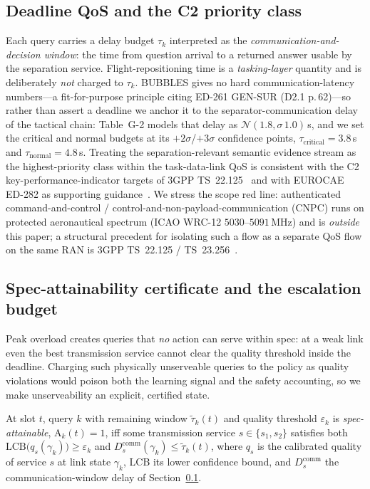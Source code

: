 \subsection{Deadline QoS and the C2 priority class}\label{subsec:qos}
Each query carries a delay budget $\tau_k$ interpreted as the
\emph{communication-and-decision window}: the time from question arrival to a
returned answer usable by the separation service. Flight-repositioning time
is a \emph{tasking-layer} quantity and is deliberately \emph{not} charged to
$\tau_k$. BUBBLES gives no hard communication-latency numbers---a
fit-for-purpose principle citing ED-261 GEN-SUR (D2.1 p.\,62)---so rather
than assert a deadline we anchor it to the separator-communication delay of
the tactical chain: Table~G-2 models that delay as $\mathcal{N}(1.8,
\sigma\,1.0)$\,s, and we set the critical and normal budgets at its
$+2\sigma$/$+3\sigma$ confidence points, $\tau_{\mathrm{critical}}=3.8$\,s
and $\tau_{\mathrm{normal}}=4.8$\,s. Treating the separation-relevant
semantic evidence stream as the highest-priority class within the
task-data-link QoS is consistent with the C2 key-performance-indicator
targets of 3GPP TS~22.125~\cite{3gpp2022ts22125} and with EUROCAE ED-282 as
supporting guidance~\cite{eurocae2020ed282}. We stress the scope red line:
authenticated command-and-control / control-and-non-payload-communication
(CNPC) runs on protected aeronautical spectrum (ICAO WRC-12
$5030$--$5091$\,MHz) and is \emph{outside} this paper; a structural
precedent for isolating such a flow as a separate QoS flow on the same RAN
is 3GPP TS~22.125 / TS~23.256~\cite{3gpp2022ts22125,3gpp2022ts23256}.

\subsection{Spec-attainability certificate and the escalation budget}
\label{subsec:cert}
Peak overload creates queries that \emph{no} action can serve within spec:
at a weak link even the best transmission service cannot clear the quality
threshold inside the deadline. Charging such physically unserveable
queries to the policy as quality violations would poison both the learning
signal and the safety accounting, so we make unserveability an explicit,
certified state.

\begin{definition}\label{def:cert}
At slot $t$, query $k$ with remaining window $\tilde\tau_k(t)$ and quality
threshold $\varepsilon_k$ is \emph{spec-attainable},
$\mathrm{A}_k(t)=1$, iff some transmission service $s\in\{s_1,s_2\}$
satisfies both
$\mathrm{LCB}\big(q_s(\gamma_k)\big)\ge\varepsilon_k$ and
$D^{\mathrm{comm}}_s(\gamma_k)\le\tilde\tau_k(t)$,
where $q_s$ is the calibrated quality of service $s$ at link state
$\gamma_k$, LCB its lower confidence bound, and $D^{\mathrm{comm}}_s$ the
communication-window delay of Section~\ref{subsec:qos}.
\end{definition}


